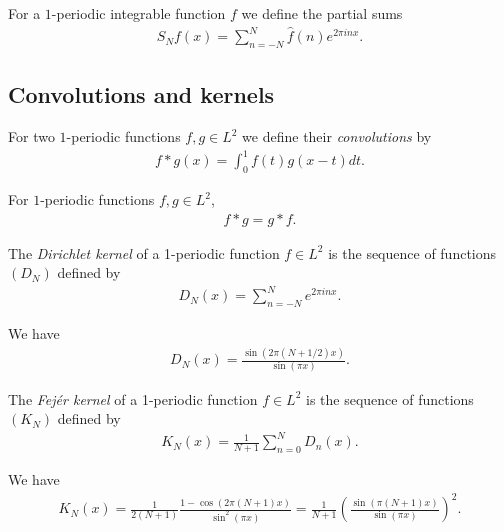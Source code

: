 \documentclass{article}
\begin{document}
\begin{definition}
    For a $1$-periodic integrable function $f$ we define the partial sums
    \begin{align*}
        S_Nf(x)=\sum_{n=-N}^N \hat f(n) e^{2\pi inx}.
    \end{align*}
\end{definition}

\subsection{Convolutions and kernels}

\begin{definition}
    For two $1$-periodic functions $f,g\in L^2$ we define their \emph{convolutions}
    by
    \begin{align*}
        f*g(x)=\int_0^1 f(t)g(x-t)dt.
    \end{align*}
\end{definition}

\begin{lemma}[Notes 5.2]
    For $1$-periodic functions $f,g\in L^2$,
    \begin{align*}
        f*g=g*f.
    \end{align*}
\end{lemma}

\begin{definition}
    The \emph{Dirichlet kernel} of a 1-periodic function $f\in L^2$ is the sequence of functions
    $(D_N)$ defined by
    \begin{align*}
        D_N(x)=\sum_{n=-N}^N e^{2\pi inx}.
    \end{align*}
\end{definition}

\begin{lemma}[Notes 5.3]
    We have
    \begin{align*}
        D_N(x)=\frac{\sin(2\pi(N+1/2)x)}{\sin(\pi x)}.
    \end{align*}
\end{lemma}

\begin{definition}
    The \emph{Fej\'er kernel} of a 1-periodic function $f\in L^2$ is the sequence of functions
    $(K_N)$ defined by
    \begin{align*}
        K_N(x)=\frac{1}{N+1}\sum_{n=0}^ND_n(x).
    \end{align*}
\end{definition}

\begin{lemma}[Notes 5.4]
    We have
    \begin{align*}
        K_N(x)=\frac{1}{2(N+1)}\frac{1-\cos(2\pi(N+1)x)}{\sin^2(\pi x)}
        =\frac{1}{N+1}\left(\frac{\sin(\pi(N+1)x)}{\sin(\pi x)}\right)^2.
    \end{align*}
\end{lemma}
\end{document}
